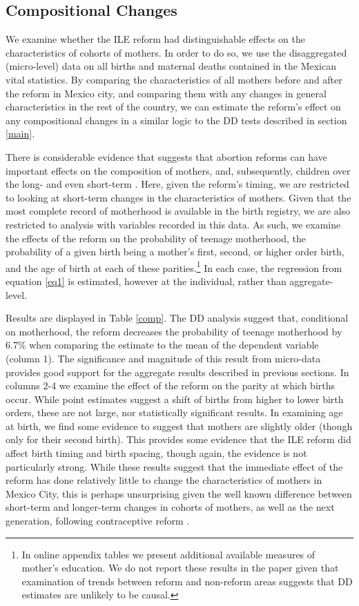 \documentclass[a4paper, 11pt]{article}
\begin{document}
\begin{spacing}{2}
\subsection{Compositional Changes}\label{CompositionalChanges}
We examine whether the ILE reform had distinguishable effects on the characteristics of cohorts of mothers.  In order to do so, we use the disaggregated (micro-level) data on all births and maternal deaths contained in the Mexican vital statistics.  By comparing the characteristics of all mothers before and after the reform in Mexico city, and comparing them with any changes in general characteristics in the rest of the country, we can estimate the reform's effect on any compositional changes in a similar logic to the DD tests described in section \ref{main}. 

There is considerable evidence that suggests that abortion reforms can have important effects on the composition of mothers, and, subsequently, children over the long- \citep{Ananatetal2009,Pop-Eleches,Bailey2013} and even short-term \citep{Baileyetal2014}.  Here, given the reform's timing, we are restricted to looking at short-term changes in the characteristics of mothers.  Given that the most complete record of motherhood is available in the birth registry, we are also restricted to analysis with variables recorded in this data.  As such, we examine the effects of the reform on the probability of teenage motherhood, the probability of a given birth being a mother's first, second, or higher order birth, and the age of birth at each of these parities.\footnote{In online appendix tables we present additional available measures of mother's education.  We do not report these results in the paper given that examination of trends between reform and non-reform areas suggests that DD estimates are unlikely to be causal.}  In each case, the regression from equation \ref{eq1} is estimated, however at the individual, rather than aggregate-level.

Results are displayed in Table \ref{comp}. The DD analysis suggest that, conditional on motherhood, the reform decreases the probability of teenage motherhood by 6.7\% when comparing the estimate to the mean of the dependent variable (column 1). The significance and magnitude of this result from micro-data provides good support for the aggregate results described in previous sections.  In columns 2-4 we examine the effect of the reform on the parity at which births occur.  While point estimates suggest a shift of births from higher to lower birth orders, these are not large, nor statistically significant results.  In examining age at birth, we find some evidence to suggest that mothers are slightly older (though only for their second birth).  This provides some evidence that the ILE reform did affect birth timing and birth spacing, though again, the evidence is not particularly strong.  While these results suggest that the immediate effect of the reform has done relatively little to change the characteristics of mothers in Mexico City, this is perhaps unsurprising given the well known difference between short-term and longer-term changes in cohorts of mothers, as well as the next generation, following contraceptive reform \citep{Ananatetal2009,Gruberetal1999}.


\end{spacing}
\end{document}

